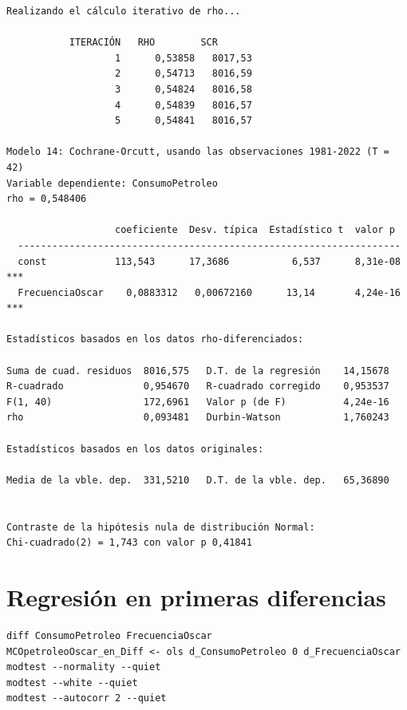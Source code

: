 \documentclass[10pt]{article}
\begin{document}
\begin{verbatim}
Realizando el cálculo iterativo de rho...

           ITERACIÓN   RHO        SCR
                   1      0,53858   8017,53
                   2      0,54713   8016,59
                   3      0,54824   8016,58
                   4      0,54839   8016,57
                   5      0,54841   8016,57

Modelo 14: Cochrane-Orcutt, usando las observaciones 1981-2022 (T = 42)
Variable dependiente: ConsumoPetroleo
rho = 0,548406

                   coeficiente  Desv. típica  Estadístico t  valor p 
  -------------------------------------------------------------------
  const            113,543      17,3686           6,537      8,31e-08 ***
  FrecuenciaOscar    0,0883312   0,00672160      13,14       4,24e-16 ***

Estadísticos basados en los datos rho-diferenciados:

Suma de cuad. residuos  8016,575   D.T. de la regresión    14,15678
R-cuadrado              0,954670   R-cuadrado corregido    0,953537
F(1, 40)                172,6961   Valor p (de F)          4,24e-16
rho                     0,093481   Durbin-Watson           1,760243

Estadísticos basados en los datos originales:

Media de la vble. dep.  331,5210   D.T. de la vble. dep.   65,36890


Contraste de la hipótesis nula de distribución Normal:
Chi-cuadrado(2) = 1,743 con valor p 0,41841
\end{verbatim}
\section*{Regresión en primeras diferencias}
\label{sec:orgbc115b4}

\begin{verbatim}
diff ConsumoPetroleo FrecuenciaOscar
MCOpetroleoOscar_en_Diff <- ols d_ConsumoPetroleo 0 d_FrecuenciaOscar
modtest --normality --quiet
modtest --white --quiet
modtest --autocorr 2 --quiet
\end{verbatim}
\end{document}
